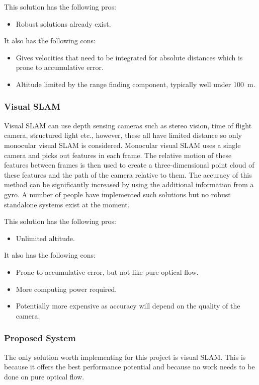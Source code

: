 \documentclass[a4paper,12pt]{article}
\begin{document}
This solution has the following pros:
\begin{itemize}
	\item Robust solutions already exist.
\end{itemize}
It also has the following cons:
\begin{itemize}
	\item Gives velocities that need to be integrated for absolute distances which is prone to accumulative error.
	\item Altitude limited by the range finding component, typically well under \SI{100}{m}.
\end{itemize}

\subsubsection{Visual SLAM}
Visual SLAM can use depth sensing cameras such as stereo vision, time of flight camera, structured light etc., however, these all have limited distance so only monocular visual SLAM is considered. Monocular visual SLAM uses a single camera and picks out features in each frame. The relative motion of these features between frames is then used to create a three-dimensional point cloud of these features and the path of the camera relative to them. The accuracy of this method can be significantly increased by using the additional information from a gyro. A number of people have implemented such solutions\cite{weiss2011monocular,chowdhary2013gps} but no robust standalone systems exist at the moment.

This solution has the following pros:
\begin{itemize}
	\item Unlimited altitude.
\end{itemize}
It also has the following cons:
\begin{itemize}
	\item Prone to accumulative error, but not like pure optical flow.
	\item More computing power required.
	\item Potentially more expensive as accuracy will depend on the quality of the camera.
\end{itemize}

\subsubsection{Proposed System\label{system}}
The only solution worth implementing for this project is visual SLAM. This is because it offers the best performance potential and because no work needs to be done on pure optical flow.
\end{document}
